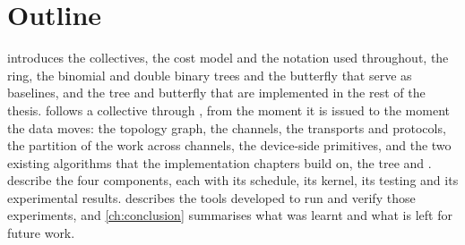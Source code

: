 \section{Outline}\label{sec:intro-outline}

 introduces the collectives, the cost model and the notation used throughout, the ring, the binomial and double binary trees and the butterfly that serve as baselines, and the \bine{} tree and butterfly that are implemented in the rest of the thesis.
 follows a collective through \nccl{}, from the moment it is issued to the moment the data moves: the topology graph, the channels, the transports and protocols, the partition of the work across channels, the device-side primitives, and the two existing algorithms that the implementation chapters build on, the tree and \pat{}.
 describe the four components, each with its schedule, its kernel, its testing and its experimental results.
 describes the tools developed to run and verify those experiments, and \cref{ch:conclusion} summarises what was learnt and what is left for future work.

